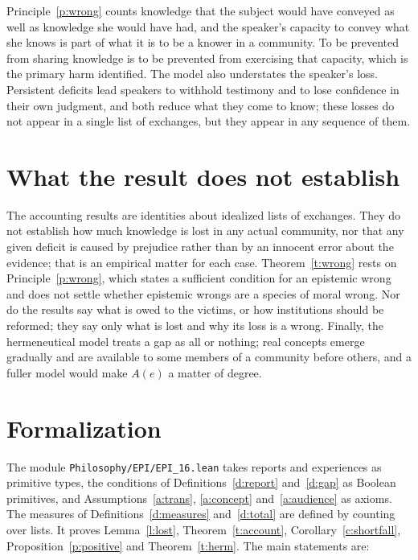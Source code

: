 \documentclass{situationist-preprint}
\begin{document}
\begin{reply}
Principle~\ref{p:wrong} counts knowledge that the subject would have conveyed as well as knowledge she would have had, and the speaker's capacity to convey what she knows is part of what it is to be a knower in a community. To be prevented from sharing knowledge is to be prevented from exercising that capacity, which is the primary harm \citet{Fricker2007} identified. The model also understates the speaker's loss. Persistent deficits lead speakers to withhold testimony \citep{Dotson2011} and to lose confidence in their own judgment, and both reduce what they come to know; these losses do not appear in a single list of exchanges, but they appear in any sequence of them.
\end{reply}

\section{What the result does not establish}

The accounting results are identities about idealized lists of exchanges. They do not establish how much knowledge is lost in any actual community, nor that any given deficit is caused by prejudice rather than by an innocent error about the evidence; that is an empirical matter for each case. Theorem~\ref{t:wrong} rests on Principle~\ref{p:wrong}, which states a sufficient condition for an epistemic wrong and does not settle whether epistemic wrongs are a species of moral wrong. Nor do the results say what is owed to the victims, or how institutions should be reformed; they say only what is lost and why its loss is a wrong. Finally, the hermeneutical model treats a gap as all or nothing; real concepts emerge gradually and are available to some members of a community before others, and a fuller model would make $A(e)$ a matter of degree.

\section{Formalization}

The module \nolinkurl{Philosophy/EPI/EPI_16.lean} takes reports and experiences as primitive types, the conditions of Definitions~\ref{d:report} and~\ref{d:gap} as Boolean primitives, and Assumptions~\ref{a:trans}, \ref{a:concept} and~\ref{a:audience} as axioms. The measures of Definitions~\ref{d:measures} and~\ref{d:total} are defined by counting over lists. It proves Lemma~\ref{l:lost}, Theorem~\ref{t:account}, Corollary~\ref{c:shortfall}, Proposition~\ref{p:positive} and Theorem~\ref{t:herm}. The main statements are:
\end{document}
